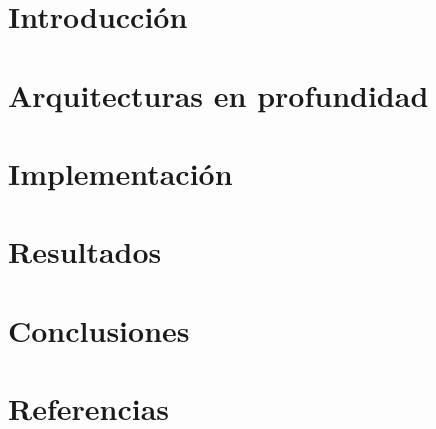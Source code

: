 \documentclass[11pt,a4paper,twoside]{tesis}
\begin{document}


\def\titulo{Licenciado }

\def\autor{Manuel Ferrer\'ia y Juan Pablo Darago}
\def\tituloTesis{Optimizaci\'on de c\'omputo QM/MM empleando arquitecturas masivamente paralelas}
\def\director{Esteban Mocskos}
\def\codirector{Mariano Camilo Gonz\'alez Lebrero}
\def\lugar{Buenos Aires, 2014}


\frontmatter
\pagestyle{empty}


%



\tableofcontents

\mainmatter
\pagestyle{headings}



\chapter{Introducci\'on}


\chapter{Arquitecturas en profundidad}


\chapter{Implementaci\'on}


\chapter{Resultados}


\chapter{Conclusiones}


\chapter{Referencias}




\appendix

\end{document}
